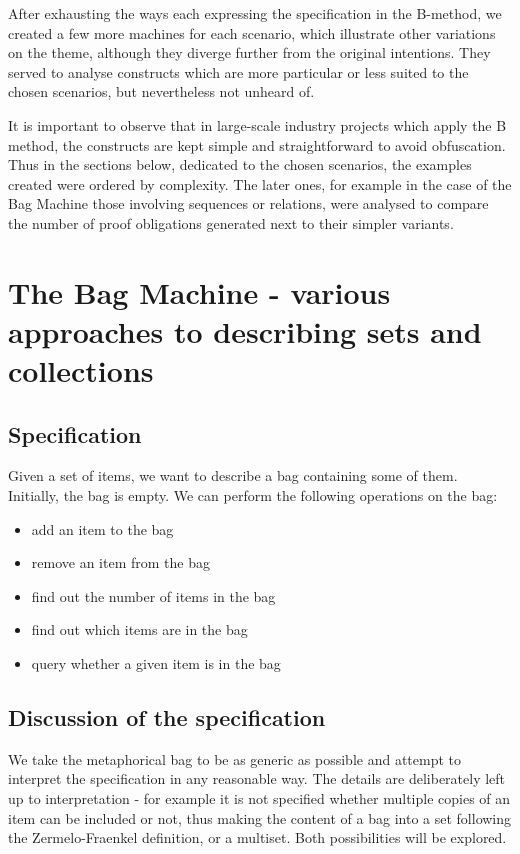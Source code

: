 \documentclass[11pt,journal]{IEEEtran}
\begin{document}
	After exhausting the ways each expressing the specification in the B-method, we created a few more machines for each scenario, which illustrate other variations on the theme, although they diverge further from the original intentions. They served to analyse constructs which are more particular or less suited to the chosen scenarios, but nevertheless not unheard of.
	
	It is important to observe that in large-scale industry projects which apply the B method, the constructs are kept simple and straightforward to avoid obfuscation. Thus in the sections below, dedicated to the chosen scenarios, the examples created were ordered by complexity. The later ones, for example in the case of the Bag Machine those involving sequences or relations, were analysed to compare the number of proof obligations generated next to their simpler variants.
	
	\section{The Bag Machine - various approaches to describing sets and collections}
	\subsection{Specification}
	Given a set of items, we want to describe a bag containing some of them. Initially, the bag is empty. We can perform the following operations on the bag:
	\begin{itemize}
		\item add an item to the bag
		\item remove an item from the bag
		\item find out the number of items in the bag
		\item find out which items are in the bag
		\item query whether a given item is in the bag
	\end{itemize}
	\subsection{Discussion of the specification}
	We take the metaphorical bag to be as generic as possible and attempt to interpret the specification in any reasonable way. The details are deliberately left up to interpretation - for example it is not specified whether multiple copies of an item can be included or not, thus making the content of a bag into a set following the Zermelo-Fraenkel definition, or a multiset. Both possibilities will be explored.
	
\end{document}
